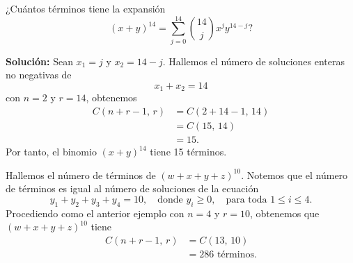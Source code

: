 \begin{myexample}
    ¿Cuántos términos tiene la expansión
    $$(x + y)^{14} = \sum_{j=0}^{14} \binom{14}{j} x^jy^{14-j}?$$

    \tcblower
    \textbf{\color{jblueleft}Solución:} Sean $x_1 = j$ y $x_2 = 14 - j$. Hallemos el número de soluciones enteras no negativas de
    $$x_1 + x_2 = 14$$
    con $n = 2$ y $r = 14$, obtenemos
    \begin{align*}
        C(n + r - 1, \, r) & = C(2 + 14 - 1, \, 14) \\
        & = C(15, \, 14) \\
        & = 15.
    \end{align*}
    Por tanto, el binomio $(x + y)^{14}$ tiene 15 términos.
\end{myexample}

\begin{myexample}
    Hallemos el número de términos de $(w + x + y + z)^{10}$. Notemos que el número de términos es igual al número de soluciones de la ecuación
    $$y_1 + y_2 + y_3 + y_4 = 10, \quad \text{donde } y_i \geq 0, \quad \text{para toda } 1 \leq i \leq 4.$$
    Procediendo como el anterior ejemplo con $n = 4$ y $r = 10$, obtenemos que $(w + x + y + z)^{10}$ tiene
    \begin{align*}
        C(n + r - 1, \, r) & = C(13, \, 10) \\
        & = 286 \text{ términos.}
    \end{align*}
\end{myexample}